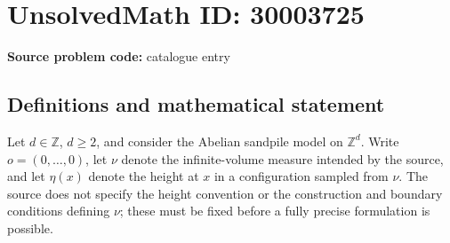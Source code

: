 \documentclass[11pt]{article}
\newcommand{\Z}{\mathbb{Z}}
\begin{document}
\section*{UnsolvedMath ID: 30003725}
\textbf{Source problem code:} catalogue entry
\subsection{Definitions and mathematical statement}
Let \(d\in\Z\), \(d\geq2\), and consider the Abelian sandpile model on \(\Z^d\). Write \(o=(0,\ldots,0)\), let \(\nu\) denote the infinite-volume measure intended by the source, and let \(\eta(x)\) denote the height at \(x\) in a configuration sampled from \(\nu\). The source does not specify the height convention or the construction and boundary conditions defining \(\nu\); these must be fixed before a fully precise formulation is possible.
\end{document}
